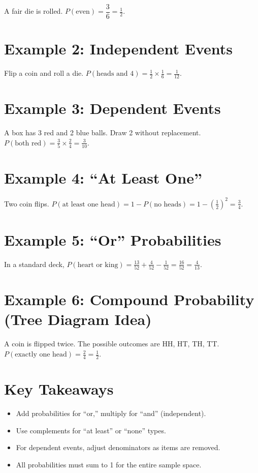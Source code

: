 \documentclass[12pt]{article}
\begin{document}
A fair die is rolled.  
\(P(\text{even}) = \dfrac{3}{6} = \boxed{\tfrac{1}{2}}\).

\section*{Example 2: Independent Events}

Flip a coin and roll a die.  
\(P(\text{heads and 4}) = \tfrac{1}{2}\times\tfrac{1}{6}=\boxed{\tfrac{1}{12}}\).

\section*{Example 3: Dependent Events}

A box has 3 red and 2 blue balls. Draw 2 without replacement.  
\(P(\text{both red})=\tfrac{3}{5}\times\tfrac{2}{4}=\boxed{\tfrac{3}{10}}\).

\section*{Example 4: “At Least One”}

Two coin flips. \(P(\text{at least one head})=1-P(\text{no heads})=1-(\tfrac{1}{2})^2=\boxed{\tfrac{3}{4}}\).

\section*{Example 5: “Or” Probabilities}

In a standard deck, \(P(\text{heart or king})=\tfrac{13}{52}+\tfrac{4}{52}-\tfrac{1}{52}=\boxed{\tfrac{16}{52}=\tfrac{4}{13}}\).

\section*{Example 6: Compound Probability (Tree Diagram Idea)}

A coin is flipped twice. The possible outcomes are HH, HT, TH, TT.  
\(P(\text{exactly one head})=\tfrac{2}{4}=\boxed{\tfrac{1}{2}}\).

\section*{Key Takeaways}
\begin{itemize}
  \item Add probabilities for “or,” multiply for “and” (independent).
  \item Use complements for “at least” or “none” types.
  \item For dependent events, adjust denominators as items are removed.
  \item All probabilities must sum to 1 for the entire sample space.
\end{itemize}
\end{document}
